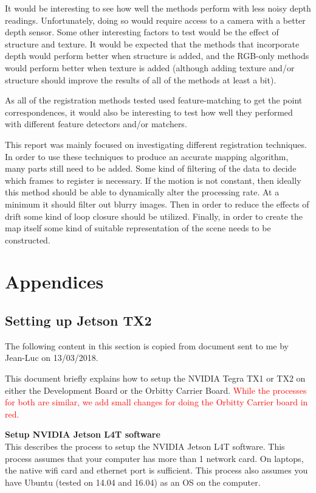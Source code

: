 \documentclass[12pt,a4paper]{article}
\newcommand{\orb}[1]{\textcolor{red}{#1}}
\begin{document}
  It would be interesting to see how well the methods perform with less noisy depth readings. Unfortunately, doing so would require access to a camera with a better depth sensor. Some other interesting factors to test would be the effect of structure and texture. It would be expected that the methods that incorporate depth would perform better when structure is added, and the RGB-only methods would perform better when texture is added (although adding texture and/or structure should improve the results of all of the methods at least a bit).

  As all of the registration methods tested used feature-matching to get the point correspondences, it would also be interesting to test how well they performed with different feature detectors and/or matchers.
   
  This report was mainly focused on investigating different registration techniques. In order to use these techniques to produce an accurate mapping algorithm, many parts still need to be added. Some kind of filtering of the data to decide which frames to register is necessary. If the motion is not constant, then ideally this method should be able to dynamically alter the processing rate. At a minimum it should filter out blurry images. Then in order to reduce the effects of drift some kind of loop closure should be utilized. Finally, in order to create the map itself some kind of suitable representation of the scene needs to be constructed.

\pagebreak



\section{Appendices}

  \subsection{Setting up Jetson TX2}
    \label{a: tx2}
    The following content in this section is copied from document sent to me by Jean-Luc on 13/03/2018.
     
    This document briefly explains how to setup the NVIDIA Tegra TX1 or TX2 on either the Development Board or the Orbitty Carrier Board. 
    \orb{While the processes for both are similar, we add small changes for doing the Orbitty Carrier board in red.}
     

    \noindent
    \textbf{Setup NVIDIA Jetson L4T software} \\
    This describes the process to setup the NVIDIA Jetson L4T software. This process assumes that your computer has more than 1 network card. On laptops, the native wifi card and ethernet port is sufficient. This process also assumes you have Ubuntu (tested on 14.04 and 16.04) as an OS on the computer.
\end{document}
